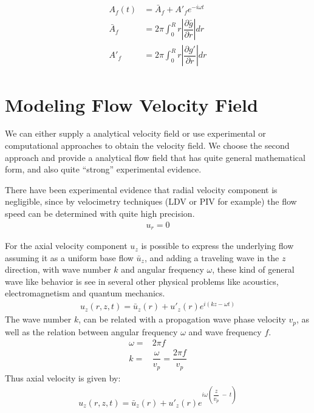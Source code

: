 \begin{align}
A_f(t)&= \bar{A}_f + A'_f e^{-i\omega t}\\
\bar{A}_f&= 2\pi \int_0^R r \left|\dfrac{\partial \bar{g}}{\partial r}\right| dr \label{Ab}\\
A'_f&= 2\pi \int_0^R r \left|\dfrac{\partial g'}{\partial r}\right| dr \label{Al}
\end{align}





\clearpage
\section{Modeling Flow Velocity Field}\label{velo_fields}
We can either supply a analytical velocity field or use experimental or computational approaches to obtain the velocity field.
We choose the second approach and provide a analytical flow field that has quite general mathematical form, and also quite ``strong'' experimental evidence.

\begin{assumption} 
There have been experimental evidence that radial velocity component is negligible, since by velocimetry techniques (LDV or PIV for example) the flow speed can be determined with quite high precision.
\begin{align}
	u_r=0
\end{align}

For the axial velocity component $u_z$ is possible to express the underlying flow assuming it as a uniform base flow $\bar{u}_z$, and adding a traveling wave in the $z$ direction, with wave number $k$ and angular frequency $\omega$, these kind of general wave like behavior is see in several other physical problems like acoustics, electromagnetism and quantum mechanics.
\begin{align*}
	u_z(r,z,t)=\bar{u}_z(r) + u'_z(r)e^{i(kz - \omega t)}
\end{align*}
The wave number $k$, can be related with a propagation wave phase velocity $v_p$, as well as the relation between angular frequency $\omega$ and wave frequency $f$. 
\begin{align}
	\omega=&2 \pi f\\
	k =&\dfrac{\omega}{v_p}= \dfrac{2\pi f}{v_p}
\end{align}
Thus axial velocity is given by:
\begin{align}
	u_z(r,z,t)=\bar{u}_z(r) + u'_z(r)e^{i\omega\left(\dfrac{z}{v_p}\ -\ t\right)}
\end{align}
\label{u_ass}
\end{assumption}

